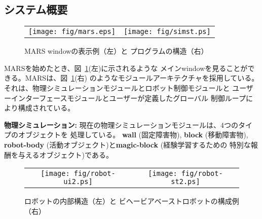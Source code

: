 \subsection{システム概要}

\begin{figure}[h]
\begin{center}
\begin{tabular}{c c}
\texttt{[image: fig/mars.eps]} &
\texttt{[image: fig/simst.ps]} \\
\end{tabular}
\caption{\label{MARSOverview} MARS windowの表示例（左）と
プログラムの構造（右）}
\end{center}
\end{figure}

MARSを始めたとき、図~\ref{MARSOverview}(左)に示されるような
メインwindowを見ることができる。MARSは、図~\ref{MARSOverview}(右)
のようなモジュールアーキテクチャを採用している。
それは、物理シミュレーションモジュールとロボット制御モジュールと
ユーザーインターフェースモジュールとユーザーが定義したグローバル
制御ループにより構成されている。

{\bf 物理シミュレーション:}
現在の物理シミュレーションモジュールは、4つのタイプのオブジェクトを
処理している。
{\bf wall} (固定障害物), {\bf block} (移動障害物), {\bf
robot-body} (活動オブジェクト)と{\bf magic-block} (経験学習するための
特別な報酬を与えるオブジェクト)である。

\begin{figure}
\begin{center}
\begin{tabular}{c c}
\texttt{[image: fig/robot-ui2.ps]} &
\texttt{[image: fig/robot-st2.ps]} \\
\end{tabular}
\end{center}
\caption{\label{fig:robotst}ロボットの内部構造（左）と
ビヘービアベーストロボットの構成例（右）}
\end{figure}

